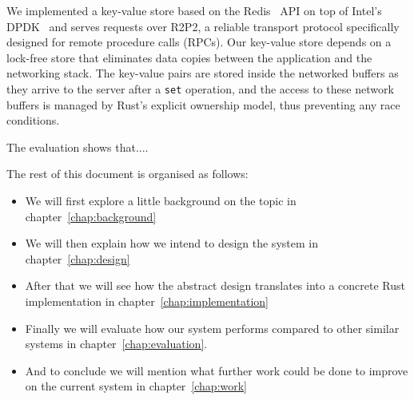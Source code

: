 We implemented a key-value store based on the Redis~\cite{url:redis}
API on top of Intel's DPDK~\cite{dpdk} and serves requests over R2P2,
a reliable transport protocol specifically designed for remote
procedure calls (RPCs). Our key-value store depends on a lock-free
store that eliminates data copies between the application and the
networking stack. The key-value pairs are stored inside the networked
buffers as they arrive to the server after a \texttt{set} operation,
and the access to these network buffers is managed by Rust's explicit
ownership model, thus preventing any race conditions.

The evaluation shows that....

The rest of this document is organised as follows: %
\begin{itemize}
\item We will first explore a little background on the topic in
  chapter~\ref{chap:background}
\item We will then explain how we intend to design the system in
  chapter~\ref{chap:design}
\item After that we will see how the abstract design translates into a
  concrete Rust implementation in chapter~\ref{chap:implementation}
\item Finally we will evaluate how our system performs compared to
  other similar systems in chapter~\ref{chap:evaluation}.
\item And to conclude we will mention what further work could be done
  to improve on the current system in chapter~\ref{chap:work}
\end{itemize}
